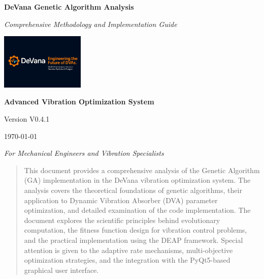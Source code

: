 \documentclass[12pt,a4paper]{article}
\begin{document}
\begin{titlepage}
    \centering
    \vspace*{2cm}
    
    {\Huge\bfseries\color{blue!70!black} DeVana Genetic Algorithm Analysis}
    
    \vspace{1cm}
    
    {\Large\textit{Comprehensive Methodology and Implementation Guide}}
    
    \vspace{2cm}
    
    \includegraphics[width=0.3\textwidth]{../../Logo.png}
    
    \vspace{2cm}
    
    {\large\textbf{Advanced Vibration Optimization System}}
    
    \vspace{0.5cm}
    
    {\large Version V0.4.1}
    
    \vfill
    
    {\large \today}
    
    \vspace{1cm}
    
    {\large\textit{For Mechanical Engineers and Vibration Specialists}}
\end{titlepage}

\tableofcontents
\newpage

\begin{abstract}
This document provides a comprehensive analysis of the Genetic Algorithm (GA) implementation in the DeVana vibration optimization system. The analysis covers the theoretical foundations of genetic algorithms, their application to Dynamic Vibration Absorber (DVA) parameter optimization, and detailed examination of the code implementation. The document explores the scientific principles behind evolutionary computation, the fitness function design for vibration control problems, and the practical implementation using the DEAP framework. Special attention is given to the adaptive rate mechanisms, multi-objective optimization strategies, and the integration with the PyQt5-based graphical user interface.
\end{abstract}
\end{document}
